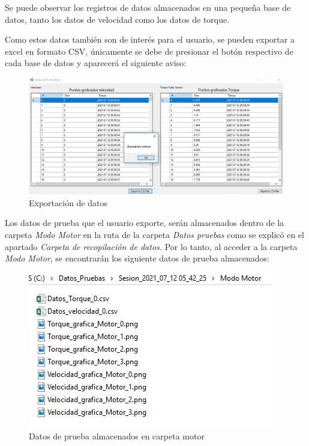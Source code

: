 \documentclass[12pt,titlepage]{article}
\begin{document}
Se puede observar los registros de datos almacenados en una pequeña base de datos, tanto los datos de velocidad como los datos de torque.

\newpage
 Como estos datos también son de interés para el usuario, se pueden exportar a excel en formato CSV, únicamente se debe de presionar el botón respectivo de cada base de datos y aparecerá el siguiente  aviso: 

\begin{figure}[htbp]
\hspace*{2.0cm} 
\includegraphics[scale=0.50]{export_data}
\caption{Exportación de datos}
\end{figure}

Los datos de prueba que el usuario exporte, serán almacenados dentro de la carpeta \textit{Modo Motor} en la ruta de la carpeta \textit{Datos pruebas} como se explicó en el apartado \textit{Carpeta de recopilación de datos.} Por lo tanto, al acceder a la carpeta \textit{Modo Motor}, se encontrarán los siguiente datos de prueba almacenados: \\ 
\begin{figure}[htbp]
\hspace*{3.5cm} 
\includegraphics[scale=0.70]{datos2}
\caption{Datos de prueba almacenados en carpeta motor}
\end{figure}
\end{document}
